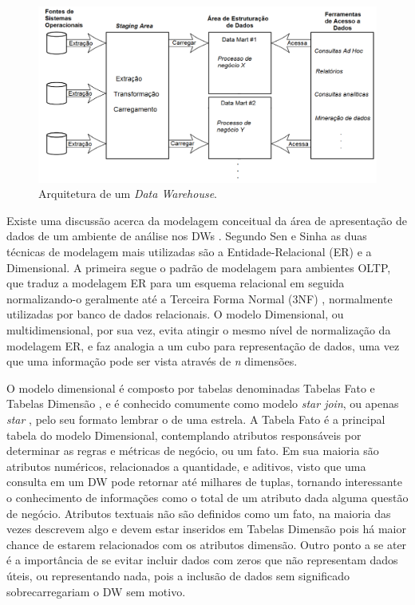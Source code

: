\begin{figure}[htpb]
	\centering
		\includegraphics[width=\textwidth]{img/dw_arc}
	\caption{Arquitetura de um \textit{Data Warehouse}.}
	\label{fig:dw_arq}
\end{figure}

Existe uma discussão acerca da modelagem conceitual da área de apresentação de dados de um ambiente de análise nos DWs \cite{sen2005comparison}. Segundo Sen e Sinha \cite{sen2005comparison} as duas técnicas de modelagem mais utilizadas são a Entidade-Relacional (ER) e a Dimensional. A primeira segue o padrão de modelagem para ambientes OLTP, que traduz a modelagem ER para um esquema relacional em seguida normalizando-o geralmente até a Terceira Forma Normal (3NF) \cite{kimball2002dw}, normalmente utilizadas por banco de dados relacionais. O modelo Dimensional, ou multidimensional, por sua vez, evita atingir o mesmo nível de normalização da modelagem ER, e faz analogia a um cubo para representação de dados, uma vez que uma informação pode ser vista através de \textit{n} dimensões. 

O modelo dimensional é composto por tabelas denominadas Tabelas Fato e Tabelas Dimensão \cite{kimball2002dw}, e é conhecido comumente como modelo \textit{star join}, ou apenas \textit{star} \cite{sen2005comparison}, pelo seu formato lembrar o de uma estrela. A Tabela Fato é a principal tabela do modelo Dimensional, contemplando atributos responsáveis por determinar as regras e métricas de negócio, ou um fato. Em sua maioria são atributos numéricos, relacionados a quantidade, e aditivos, visto que uma consulta em um DW pode retornar até milhares de tuplas, tornando interessante o conhecimento de informações como o total de um atributo dada alguma questão de negócio. Atributos textuais não são definidos como um fato, na maioria das vezes descrevem algo e devem estar inseridos em Tabelas Dimensão pois há maior chance de estarem relacionados com os atributos dimensão. Outro ponto a se ater é a importância de se evitar incluir dados com zeros que não representam dados úteis, ou representando nada, pois a inclusão de dados sem significado sobrecarregariam o DW sem motivo.

